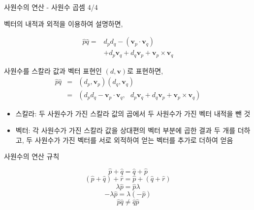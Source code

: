 \begin{frame}[fragile]{사원수의 연산 - 사원수 곱셈 4/4}

{\small
벡터의 내적과 외적을 이용하여 설명하면,

\begin{eqnarray}\nonumber
\hat{p}\hat{q} = & d_p d_q  - (\mathbf v_p \cdot \mathbf v_q)  \\ \nonumber
&+ d_p \mathbf v_q + d_q \mathbf v_p + \mathbf v_p \times \mathbf v_q \nonumber
\end{eqnarray}


사원수를 스칼라 값과 벡터 표현인 $(d, \mathbf v)$로 표현하면,
\begin{eqnarray}\nonumber
\hat{p}\hat{q} & = & (d_p, \mathbf v_p) (d_q , \mathbf v_q) \\ \nonumber
& =  & ( d_p d_q  - \mathbf v_p \cdot \mathbf v_q , ~~~ d_p \mathbf v_q + d_q \mathbf v_p + \mathbf v_p \times \mathbf v_q ) \nonumber
\end{eqnarray}


\begin{itemize}
\item 스칼라: 두 사원수가 가진 스칼라 값의 곱에서 두 사원수가 가진 벡터 내적을 뺀 것
\item 벡터: 각 사원수가 가진 스칼라 값을 상대편의 벡터 부분에 곱한 결과 두 개를 더하고, 두 사원수가 가진 벡터를 서로 외적하여 얻는 벡터를 추가로 더하여 얻음
\end{itemize}
}

\end{frame}

\begin{frame}[fragile]{사원수의 연산 규칙}

$$\hat{p} + \hat{q} = \hat{q} + \hat{p}$$
$$(\hat{p} + \hat{q}) + \hat{r} = \hat{p} + (\hat{q} + \hat{r} )$$
$$\lambda \hat p = \hat p \lambda$$
$$- \lambda \hat p = \lambda ( - \hat p)$$
$$\hat p \hat q \neq \hat q \hat p$$

\end{frame}


